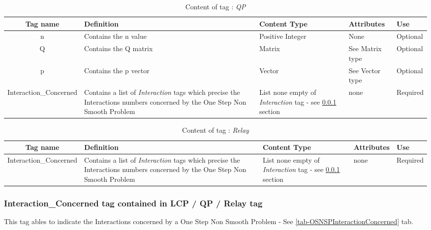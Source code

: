 \begin{table}[!hbp]
\begin{center}
\begin{tabular}{|c|p{4cm}|p{2cm}|p{2cm}|p{2cm}|}
\hline
\bf{Tag name} & \bf{Definition} & \bf{Content Type} & \bf{Attributes} & \bf{Use}
\\\hline
\hline
n		  & Contains the n value & Positive Integer & None &  Optional \\
\hline
Q		  & Contains the Q matrix & Matrix & See Matrix type &  Optional \\
\hline
p		  & Contains the p vector & Vector & See Vector type &  Optional \\
\hline
Interaction\_Concerned	  & Contains a list of \textit{Interaction} tags which precise the Interactions numbers concerned by the One Step Non Smooth Problem & List none empty of \textit{Interaction} tag - see \ref{OSNSPInteractionConTag} section& none &  Required \\
\hline
\end{tabular}
\end{center}
\caption{Content of tag : \textit{QP}}
\label{tab-QPTag}
\end{table}

\begin{table}[!hbp]
\begin{center}
\begin{tabular}{|c|p{4cm}|p{2cm}|p{2cm}|p{2cm}|}
\hline
\bf{Tag name} & \bf{Definition} & \bf{Content Type} & \bf{Attributes} & \bf{Use}
\\\hline
\hline
Interaction\_Concerned	  & Contains a list of \textit{Interaction} tags which precise the Interactions numbers concerned by the One Step Non Smooth Problem & List none empty of \textit{Interaction} tag - see \ref{OSNSPInteractionConTag} section& none &  Required \\
\hline
\end{tabular}
\end{center}
\caption{Content of tag : \textit{Relay}}
\label{tab-RelayTag}
\end{table}



\subsubsection{Interaction\_Concerned tag contained in LCP / QP / Relay tag}
\label{OSNSPInteractionConTag}


This tag ables to indicate the Interactions concerned by a One Step Non Smooth Problem - See \ref{tab-OSNSPInteractionConcerned} tab.\\


